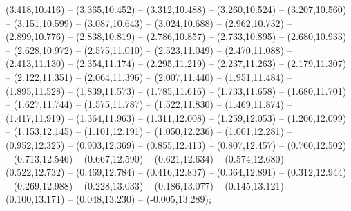 (3.418,10.416) -- (3.365,10.452) -- (3.312,10.488) -- (3.260,10.524) -- (3.207,10.560) -- (3.151,10.599) -- (3.087,10.643) -- (3.024,10.688) -- (2.962,10.732) -- (2.899,10.776) -- (2.838,10.819) -- (2.786,10.857) -- (2.733,10.895) -- (2.680,10.933) -- (2.628,10.972) -- (2.575,11.010) -- (2.523,11.049) -- (2.470,11.088) -- (2.413,11.130) -- (2.354,11.174) -- (2.295,11.219) -- (2.237,11.263) -- (2.179,11.307) -- (2.122,11.351) -- (2.064,11.396) -- (2.007,11.440) -- (1.951,11.484) -- (1.895,11.528) -- (1.839,11.573) -- (1.785,11.616) -- (1.733,11.658) -- (1.680,11.701) -- (1.627,11.744) -- (1.575,11.787) -- (1.522,11.830) -- (1.469,11.874) -- (1.417,11.919) -- (1.364,11.963) -- (1.311,12.008) -- (1.259,12.053) -- (1.206,12.099) -- (1.153,12.145) -- (1.101,12.191) -- (1.050,12.236) -- (1.001,12.281) -- (0.952,12.325) -- (0.903,12.369) -- (0.855,12.413) -- (0.807,12.457) -- (0.760,12.502) -- (0.713,12.546) -- (0.667,12.590) -- (0.621,12.634) -- (0.574,12.680) -- (0.522,12.732) -- (0.469,12.784) -- (0.416,12.837) -- (0.364,12.891) -- (0.312,12.944) -- (0.269,12.988) -- (0.228,13.033) -- (0.186,13.077) -- (0.145,13.121) -- (0.100,13.171) -- (0.048,13.230) -- (-0.005,13.289);
